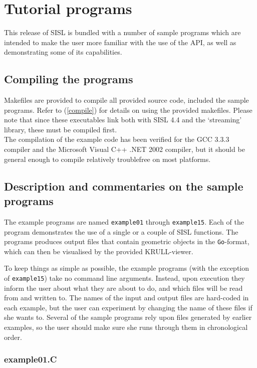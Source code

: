 \chapter{Tutorial programs}

This release of SISL is bundled with a number of sample programs which are intended
to make the user more familiar with the use of the API, as well as demonstrating 
some of its capabilities.  

\section{Compiling the programs}
Makefiles are provided to compile all provided source code, included the sample programs.
Refer to (\ref{compile}) for details on using the provided makefiles.  Please note 
that since these executables link both with SISL 4.4 and the `streaming' library, these 
must be compiled first.\\

The compilation of the example code has been verified for the GCC 3.3.3 compiler 
and the Microsoft Visual C++ .NET 2002 compiler, but it should be general enough to 
compile relatively troublefree on most platforms.

\section{Description and commentaries on the sample programs}

The example programs are named \verb/example01/ through \verb/example15/.  Each of the
program demonstrates the use of a single or a couple of SISL functions.  The programs
produces output files that contain geometric objects in the \verb/Go/-format, which 
can then be visualised by the provided KRULL-viewer.  

To keep things as simple as possible, the example programs (with the exception of
\verb/example15/) take no command line arguments.  Instead, upon execution they inform
the user about what they are about to do, and which files will be read from and written
to.  The names of the input and output files are hard-coded in each example, but the
user can experiment by changing the name of these files if she wants to.  Several of
the sample programs rely upon files generated by earlier examples, so the user should 
make sure she runs through them in chronological order.

\subsection{example01.C}

